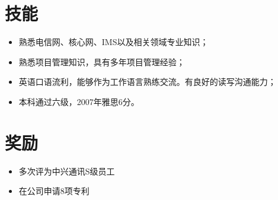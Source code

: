\documentclass[]{res}
\begin{document}
\begin{resume}


\section{技能} 
\begin{itemize}
\item 熟悉电信网、核心网、IMS以及相关领域专业知识；
\item 熟悉项目管理知识，具有多年项目管理经验；
\item 英语口语流利，能够作为工作语言熟练交流。有良好的读写沟通能力；
\item 本科通过六级，2007年雅思6分。
\end{itemize}

\section{奖励}          
\begin{itemize}
\item 多次评为中兴通讯S级员工
\item 在公司申请8项专利
\end{itemize}

\end{resume}
\end{document}
